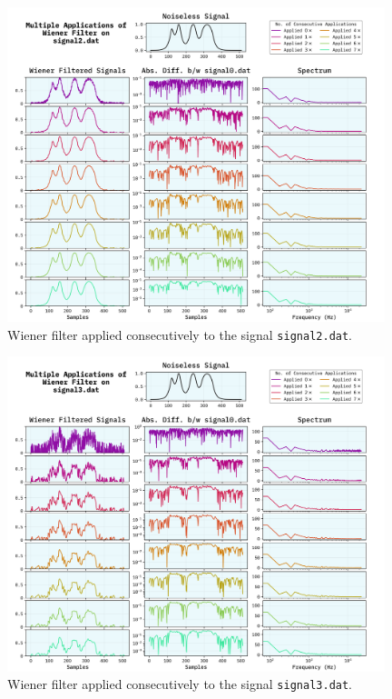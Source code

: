 \documentclass[10pt, titlepage, a4paper]{article}
\begin{document}
\begin{figure}[p]
    \centering
    \includegraphics[width=0.98\textwidth]{../WienerFilter/Images/multiple-signal2.dat.png}
    \caption{Wiener filter applied consecutively to the signal \texttt{signal2.dat}.}
    \label{fig:wiener-filter-2-2}
\end{figure}

\begin{figure}[p]
    \centering
    \includegraphics[width=0.98\textwidth]{../WienerFilter/Images/multiple-signal3.dat.png}
    \caption{Wiener filter applied consecutively to the signal \texttt{signal3.dat}.}
    \label{fig:wiener-filter-3-2}
\end{figure}
\end{document}
